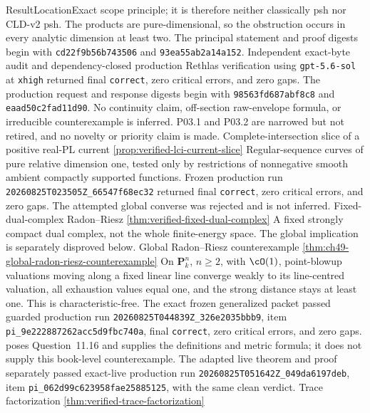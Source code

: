 \begin{AppLProvenanceLedger}{Result}{Location}{Exact scope}
{   principle; it is therefore neither classically psh nor CLD-v2 psh.  The
   products are pure-dimensional, so the obstruction occurs in every
   analytic dimension at least two.  The principal statement and proof
   digests begin with \texttt{cd22f9b56b743506} and
   \texttt{93ea55ab2a14a152}.  Independent exact-byte audit and
   dependency-closed production Rethlas verification using
   \texttt{gpt-5.6-sol} at \texttt{xhigh} returned final
   \texttt{correct}, zero critical errors, and zero gaps.  The production
   request and response digests begin with
   \texttt{98563fd687abf8c8} and \texttt{eaad50c2fad11d90}.  No continuity
   claim, off-section raw-envelope formula, or irreducible counterexample is
   inferred.  P03.1 and P03.2 are narrowed but not retired, and no novelty or
   priority claim is made.}
\AppLProvenanceRecord
  {Complete-intersection slice of a positive real-PL current}
  {\cref{prop:verified-lci-current-slice}}
  {Regular-sequence curves of pure relative dimension one, tested only by
   restrictions of nonnegative smooth ambient compactly supported
   functions.  Frozen production run
   \nolinkurl{20260825T023505Z_66547f68ec32} returned final
   \texttt{correct}, zero critical errors, and zero gaps.  The attempted
   global converse was rejected and is not inferred.}
\AppLProvenanceRecord
  {Fixed-dual-complex Radon--Riesz}
  {\cref{thm:verified-fixed-dual-complex}}
  {A fixed strongly compact dual complex, not the whole finite-energy
   space.  The global implication is separately disproved below.}
\AppLProvenanceRecord
  {Global Radon--Riesz counterexample}
  {\cref{thm:ch49-global-radon-riesz-counterexample}}
  {On \(\mathbf P^n_k\), \(n\ge2\), with \(\cO(1)\), point-blowup
   valuations moving along a fixed linear line converge weakly to its
   line-centred valuation, all exhaustion values equal one, and the strong
   distance stays at least one.  This is characteristic-free.  The exact
   frozen generalized packet passed guarded production run
   \nolinkurl{20260825T044839Z_326e2035bbb9}, item
   \nolinkurl{pi_9e222887262acc5d9fbc740a}, final \texttt{correct}, zero
   critical errors, and zero gaps.  \cite{BJ22} poses Question~11.16 and
   supplies the definitions and metric formula; it does not supply this
   book-level counterexample.
   The adapted live theorem and proof separately passed exact-live production
   run \nolinkurl{20260825T051642Z_049da6197deb}, item
   \nolinkurl{pi_062d99c623958fae25885125}, with the same clean verdict.}
\AppLProvenanceRecord
  {Trace factorization}
  {\cref{thm:verified-trace-factorization}}

\end{AppLProvenanceLedger}
